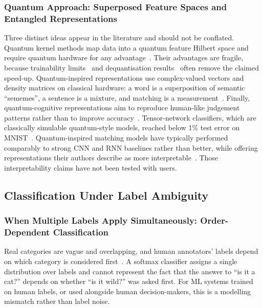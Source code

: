\documentclass[pdflatex,sn-basic]{sn-jnl}
\begin{document}
\subsubsection{Quantum Approach: Superposed Feature Spaces and Entangled Representations}
Three distinct ideas appear in the literature and should not be conflated. Quantum kernel methods map data into a quantum feature Hilbert space and require quantum hardware for any advantage~\citep{Schuld2019,Biamonte2017}. Their advantages are fragile, because trainability limits~\citep{Cerezo2021} and dequantisation results~\citep{Tang2019,Aaronson2015} often remove the claimed speed-up. Quantum-inspired representations use complex-valued vectors and density matrices on classical hardware: a word is a superposition of semantic ``sememes'', a sentence is a mixture, and matching is a measurement~\citep{Li2019,Zhang2018,Zhang2025}. Finally, quantum-cognitive representations aim to reproduce human-like judgement patterns rather than to improve accuracy~\citep{Maksimovic2025}. Tensor-network classifiers, which are classically simulable quantum-style models, reached below 1\% test error on MNIST~\citep{Stoudenmire2016}. Quantum-inspired matching models have typically performed comparably to strong CNN and RNN baselines rather than better, while offering representations their authors describe as more interpretable~\citep{Li2019}. Those interpretability claims have not been tested with users.

\subsection{Classification Under Label Ambiguity}\label{sec:labels}

\subsubsection{When Multiple Labels Apply Simultaneously: Order-Dependent Classification}
Real categories are vague and overlapping, and human annotators' labels depend on which category is considered first~\citep{Blutner2013,Wang2016}. A softmax classifier assigns a single distribution over labels and cannot represent the fact that the answer to ``is it a cat?'' depends on whether ``is it wild?'' was asked first. For ML systems trained on human labels, or used alongside human decision-makers, this is a modelling mismatch rather than label noise.
\end{document}
